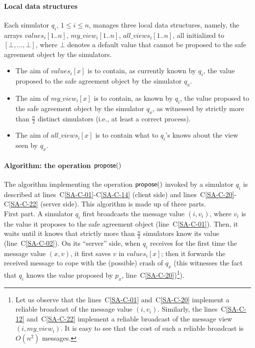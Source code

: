 \documentclass[11pt,letterpaper]{article}
\begin{document}
\paragraph{Local data structures}
Each simulator $q_i$, $1  \leq  i \leq n$, manages three local
data structures, namely, the arrays $values_i[1..n]$, $my\_view_i[1..n]$,
$all\_views_i[1..n]$, all initialized to  $[\bot,...,\bot]$, where
$\bot$ denotes  a default value that cannot be proposed to the safe agreement
object  by the  simulators.
\begin{itemize}
\vspace{-0.2cm}
\item
The aim of $values_i[x]$ is to contain, as currently known by $q_i$,
the value proposed to the  safe agreement object by the simulator $q_x$.
\vspace{-0.2cm}
\item
The aim of $my\_view_i[x]$ is to contain, as known by $q_i$, the value
proposed to the safe agreement object by the simulator $q_x$, as witnessed
by  strictly more than $\frac{n}{2}$  distinct simulators
(i.e., at least a correct process). 
\vspace{-0.2cm}
\item
The aim of $all\_views_i[x]$ is to contain what to $q_i$'s knows
about the view seen by  $q_x$.
\end{itemize}


\paragraph{Algorithm: the operation ${\sf propose}()$}
The algorithm implementing the operation ${\sf propose}()$ invoked
by a simulator $q_i$ is described at lines~C\ref{SA-C-01}-C\ref{SA-C-14}
(client side)  and lines~C\ref{SA-C-20}-C\ref{SA-C-22} (server side).
This algorithm is made up of three parts.
\\

First part.
A simulator $q_i$ first broadcasts the message {\sc value} $(i,v_i)$, where
$v_i$ is the value it proposes to the safe agreement object
 (line~C\ref{SA-C-01}). Then, it waits until it knows that strictly 
more than $\frac{n}{2}$
simulators know its value (line~C\ref{SA-C-02}).
On its ``server'' side, when $q_i$  receives for the first time
the message {\sc value} $(x,v)$, it first saves $v$ in
$values_i[x]$; then it  forwards  the received message
to cope with the (possible) crash of $q_x$ (this witnesses the fact that
$q_i$ knows the value proposed by $p_x$, line~C\ref{SA-C-20})\footnote{
Let us observe that the lines~C\ref{SA-C-01} and~C\ref{SA-C-20}
implement a reliable broadcast of the  message {\sc value} $(i,v_i)$.
Similarly,  the lines~C\ref{SA-C-12} and~C\ref{SA-C-22}
implement a reliable broadcast of the message {\sc view} $(i,my\_view_i)$.
It is easy to see that the cost of such a reliable broadcast
is $O(n^2)$ messages.}).
\end{document}
